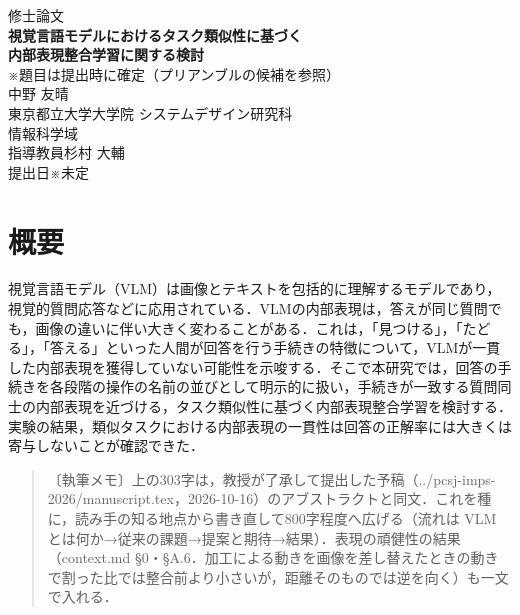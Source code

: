 \documentclass[report]{jsbook}
\newcommand{\draftnote}[1]{%
  \begin{quote}\small〔執筆メモ〕#1\end{quote}}
\begin{document}
\hypersetup{pageanchor=false}
\begin{titlepage}
\centering
\vspace*{20mm}
{\Large 修士論文}\\[18mm]
{\LARGE\bfseries 視覚言語モデルにおけるタスク類似性に基づく\\[2mm]内部表現整合学習に関する検討}\\[8mm]
{\small ※題目は提出時に確定（プリアンブルの候補を参照）}\\[28mm]
{\Large 中野 友晴}\\[8mm]
{\large 東京都立大学大学院 システムデザイン研究科\\[1mm]情報科学域}\\[16mm]
{\large 指導教員\quad 杉村 大輔}\\[24mm]
{\large 提出日\quad ※未定}\\ %
\vfill
\end{titlepage}
\hypersetup{pageanchor=true}

\frontmatter

\chapter{概要}

視覚言語モデル（VLM）は画像とテキストを包括的に理解するモデルであり，視覚的質問応答などに応用されている．VLMの内部表現は，答えが同じ質問でも，画像の違いに伴い大きく変わることがある．これは，「見つける」，「たどる」，「答える」といった人間が回答を行う手続きの特徴について，VLMが一貫した内部表現を獲得していない可能性を示唆する．そこで本研究では，回答の手続きを各段階の操作の名前の並びとして明示的に扱い，手続きが一致する質問同士の内部表現を近づける，タスク類似性に基づく内部表現整合学習を検討する．実験の結果，類似タスクにおける内部表現の一貫性は回答の正解率には大きくは寄与しないことが確認できた．

\draftnote{上の303字は，教授が了承して提出した予稿（../pcsj-imps-2026/manuscript.tex，2026-10-16）のアブストラクトと同文．これを種に，読み手の知る地点から書き直して800字程度へ広げる（流れは VLM とは何か→従来の課題→提案と期待→結果）．表現の頑健性の結果（context.md §0・§A.6．加工による動きを画像を差し替えたときの動きで割った比では整合前より小さいが，距離そのものでは逆を向く）も一文で入れる．}
\end{document}
